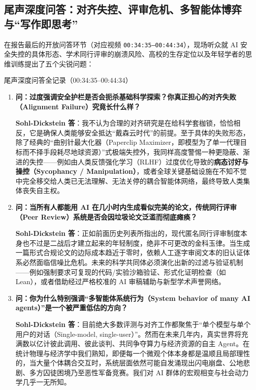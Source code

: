 \documentclass[a4paper]{article}
\begin{document}
\subsection{尾声深度问答：对齐失控、评审危机、多智能体博弈与“写作即思考”}

在报告最后的开放问答环节（对应视频 \texttt{00:34:35--00:44:34}），现场听众就 AI 安全失控的具体形态、学术同行评审的崩溃风险、高校的生存定位以及年轻学者的思维训练提出了五个尖锐问题：

\begin{importantbox}{尾声深度问答全记录（00:34:35--00:44:34）}
\begin{enumerate}
    \item \textbf{问：过度强调安全护栏是否会扼杀基础科学探索？你真正担心的对齐失败（Alignment Failure）究竟长什么样？}
    
    \textbf{Sohl-Dickstein 答}：我不认为合理的对齐研究是在给科学套枷锁，恰恰相反，它是确保人类能够安全抵达“戴森云时代”的前提。至于具体的失败形态，除了经典的“曲别针最大化器（Paperclip Maximizer，即模型为了单一代理目标而不择手段耗尽地球资源）”式极端失控外，我同样高度警惕一种更隐蔽、渐进的失控——例如由人类反馈强化学习（RLHF）过度优化导致的\textbf{病态讨好与操控（Sycophancy / Manipulation）}，或者全球关键基础设施在不知不觉中完全移交给人类已无法理解、无法关停的耦合智能体网络，最终导致人类集体丧失自主权。

    \item \textbf{问：当所有人都能用 AI 在几小时内生成看似完美的论文，传统同行评审（Peer Review）系统是否会因垃圾论文泛滥而彻底瘫痪？}
    
    \textbf{Sohl-Dickstein 答}：正如前面历史列表所指出的，现代匿名同行评审制度本身也不过是二战后才建立起来的年轻制度，绝非不可更改的金科玉律。当生成一篇形式合规论文的边际成本趋近于零时，依赖人工逐字审阅文本的旧认证体系必然面临信噪比危机。未来的科学共同体必须演化出新的过滤与验证机制——例如强制要求可复现的代码/实验沙箱验证、形式化证明检查（如 Lean），或者借助经过严格校准的 AI 审稿辅助与新型学术声誉网络。

    \item \textbf{问：你为什么特别强调“多智能体系统行为（System behavior of many AI agents）”是一个被严重低估的方向？}
    
    \textbf{Sohl-Dickstein 答}：目前绝大多数评测与对齐工作都聚焦于“单个模型与单个用户的对话（Single-model, single-user）”。然而在未来几年内，真实世界将充满数以亿计彼此调用、彼此谈判、共同争夺算力与经济资源的自主 Agent。在统计物理与经济学中我们熟知，即便每一个微观个体本身都是温顺且局部理性的，当大量个体耦合交互时，系统层面依然可能自发涌现出闪电崩盘、公地悲剧、多方囚徒困境乃至恶性军备竞赛。我们对 AI 群体的宏观相变与社会动力学几乎一无所知。


\end{enumerate}
\end{importantbox}
\end{document}
